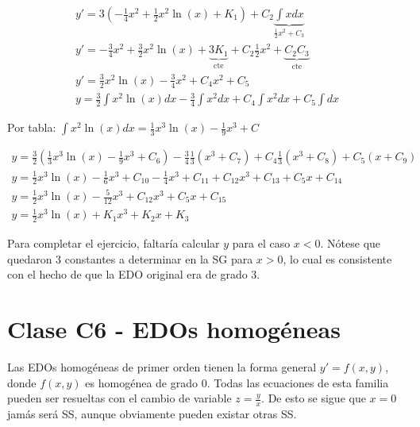 \documentclass{article}
\begin{document}
\begin{gather}
y' = 3 \left( -\frac{1}{4} x^2 + \frac{1}{2} x^2 \ln (x) + K_1 \right) + C_2 \underbrace{\int x dx}_{\frac{1}{2} x^2 + C_3} \\
y' = -\frac{3}{4} x^2 + \frac{3}{2} x^2 \ln(x) + \underbrace{3 K_1}_{\text{cte}} + C_2 \frac{1}{2} x^2 + \underbrace{C_2 C_3}_{\text{cte}} \\
y' = \frac{3}{2} x^2 \ln(x) - \frac{3}{4} x^2 + C_4 x^2 + C_5 \\
y = \frac{3}{2} \int x^2 \ln(x) dx -\frac{3}{4} \int x^2 dx + C_4 \int x^2 dx + C_5 \int dx 
\end{gather}

Por tabla: $\int x^2 \ln(x) dx = \frac{1}{3} x^3 \ln(x) - \frac{1}{9} x^3 + C$

\begin{gather}
y = \frac{3}{2} \left( \frac{1}{3} x^3 \ln(x) - \frac{1}{9} x^3 + C_6 \right) -\frac{3}{4} \frac{1}{3} (x^3 + C_7) + C_4 \frac{1}{3} (x^3 + C_8) + C_5 (x + C_9) \\
y = \frac{1}{2} x^3 \ln(x) - \frac{1}{6} x^3 + C_{10} - \frac{1}{4} x^3 + C_{11} + C_{12} x^3 + C_{13} + C_5 x + C_{14} \\
y = \frac{1}{2} x^3 \ln(x) - \frac{5}{12} x^3 + C_{12} x^3 + C_5 x + C_{15} \\
y = \frac{1}{2} x^3 \ln(x) + K_1 x^3 + K_2 x + K_3
\end{gather}

Para completar el ejercicio, faltaría calcular $y$ para el caso $x<0$. Nótese que quedaron 3 constantes a determinar en la SG para $x >0$, lo cual es consistente con el hecho de que la EDO original era de grado 3.

\section{Clase C6 - EDOs homogéneas}

Las EDOs homogéneas de primer orden tienen la forma general $y' = f(x,y)$, donde $f(x,y)$ es homogénea de grado 0. Todas las ecuaciones de esta familia pueden ser resueltas con el cambio de variable $z = \frac{y}{x}$. De esto se sigue que $x = 0$ jamás será SS, aunque obviamente pueden existar otras SS.
\end{document}
